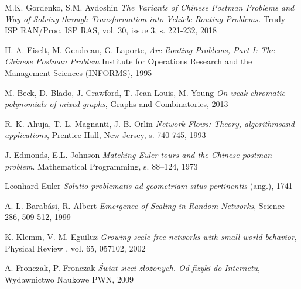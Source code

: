 \documentclass[a4paper, 12pt, twoside, openright]{article}
\begin{document}
\newpage

\begin{thebibliography}{99}
	
		M.K. Gordenko, S.M. Avdoshin \textit{The Variants of Chinese Postman Problems and Way of Solving through Transformation into Vehicle Routing Problems.} Trudy ISP RAN/Proc. ISP RAS, vol. 30, issue 3, s. 221-232, 2018
	
		H. A. Eiselt, M. Gendreau, G. Laporte, \textit{Arc Routing Problems, Part I: The Chinese Postman Problem}  Institute for Operations Research and the Management Sciences (INFORMS), 1995
	
		M. Beck, D. Blado, J. Crawford, T. Jean-Louis, M. Young \textit{On weak chromatic polynomials of mixed graphs}, Graphs and Combinatorics, 2013

		R. K. Ahuja, T. L. Magnanti, J. B. Orlin \textit{Network  Flows:  Theory,  algorithmsand applications}, Prentice Hall, New Jersey, s. 740-745, 1993
	
		J. Edmonds, E.L. Johnson \textit{Matching Euler tours and the Chinese postman problem}. Mathematical Programming, s. 88–124, 1973
	
		Leonhard Euler \textit{Solutio problematis ad geometriam situs pertinentis} (ang.), 1741
	
	
	A.-L. Barabási, R. Albert \textit{Emergence of Scaling in Random Networks}, Science 286, 509-512, 1999

	
	
	K. Klemm, V. M. Eguiluz \textit{Growing scale-free networks with small-world behavior},
	Physical Review , vol. 65, 057102, 2002
	
	A. Fronczak, P. Fronczak \textit{Świat sieci złożonych. Od fizyki do Internetu}, Wydawnictwo
	Naukowe PWN, 2009

	


\end{thebibliography}
\end{document}
